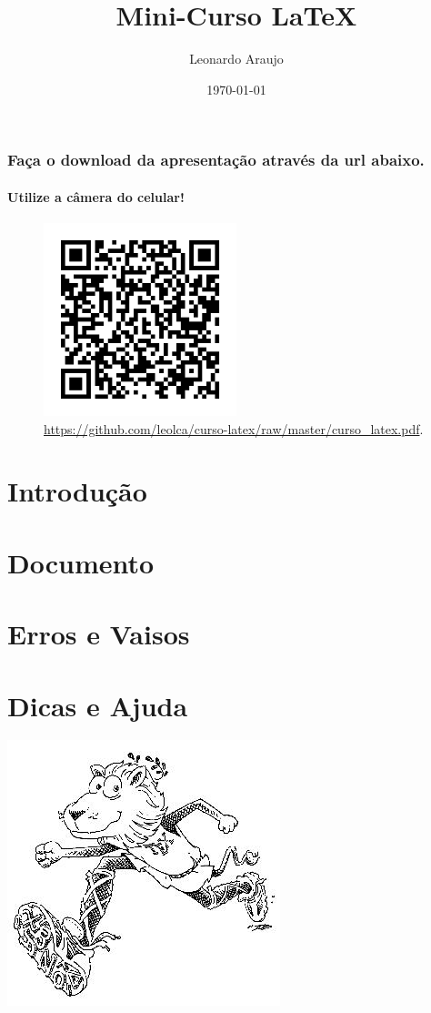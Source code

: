 \documentclass[xcolor={table}]{beamer}
\title[Mini-Curso \LaTeX{}]{Mini-Curso \LaTeX{}}
\author{Leonardo Araujo}
\date{\today}
\institute{UFSJ}
\begin{document}
\begin{frame}[plain]
\maketitle
\end{frame}


\begin{frame}
\frametitle{Faça o download da apresentação através da url abaixo.}
\framesubtitle{Utilize a câmera do celular!}
  \begin{figure}[h!]
  \centering
  \includegraphics[width=0.5\textwidth]{figures/qr_img.png}
  \caption{\url{https://github.com/leolca/curso-latex/raw/master/curso_latex.pdf}.}
  \label{fig:qrcode}
  \end{figure}
\end{frame}

\section{Introdução}\label{sec:intro}


\section{Documento}\label{sec:doc}


\section{Erros e Vaisos}\label{sec:errors}



\section{Dicas e Ajuda}\label{sec:ajuda}




\label{bibliografia}
\nocite{*}

\vspace{5em}
\begin{flushright}
\includegraphics[width=0.3\linewidth]{figures/lion04.png}
\end{flushright}
\end{document}
